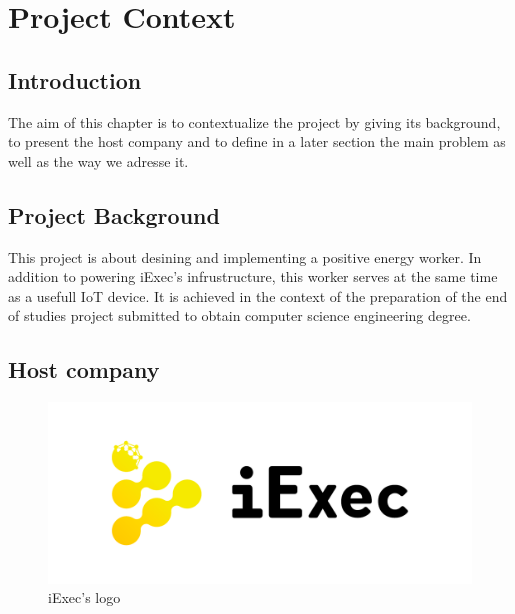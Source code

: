 
\chapter{Project Context}

\section{Introduction}
  The aim of this chapter is to contextualize the project by giving its background,
  to present the host company and to define in a later section the main problem as well
  as the way we adresse it.

\section{Project Background}
  This project is about desining and implementing a positive energy worker.
  In addition to powering iExec's infrustructure, this worker serves at the same
  time as a usefull IoT device. It is achieved in the context of the preparation of
  the end of studies project submitted to obtain computer science engineering degree.

\section{Host company}

  \begin{figure}[!h]\centering
    \includegraphics[width=.5\columnwidth]{2.0-Context/figs/iExec-logo.pdf}
    \caption{iExec's logo}
  \end{figure}

